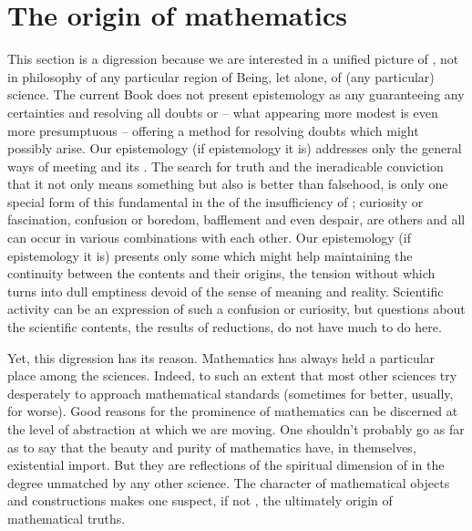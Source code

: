 \section{The origin of mathematics}\label{sec:om}
This section is a digression because we are interested in a unified picture of
, not in philosophy of any particular region of Being, let
alone, of (any particular) science.  The current Book does not present
epistemology as any  guaranteeing any certainties and
resolving all doubts or -- what appearing more modest is even more presumptuous
-- offering a method for resolving doubts which might possibly arise. Our
epistemology (if epistemology it is) addresses only the general ways of meeting
 and its . The search for truth and the
ineradicable conviction that it not only means something but also is better than
falsehood, is only one special form of this fundamental  
in the  of the insufficiency of ; curiosity
or fascination, confusion or boredom, bafflement and even despair, are
others and all can occur in various combinations with each other.  Our
epistemology (if epistemology it is) presents only some 
 which might help maintaining the continuity
between the  contents and their  origins, the
tension without which  turns into dull 
emptiness devoid of the sense of meaning and reality.  Scientific activity can
be an expression of such a confusion or curiosity, but questions about the 
scientific contents, the  results of 
reductions, do not have much to do here.

Yet, this digression has its reason.  Mathematics has always held a particular
place among the sciences.  Indeed, to such an extent that most other sciences
try desperately to approach mathematical standards (sometimes for better,
usually, for worse).  Good reasons for the prominence of mathematics can be
discerned at the level of abstraction at which we are moving.  One shouldn't
probably go as far as to say that the beauty and purity of mathematics have, in
themselves, existential import. But they are reflections of the spiritual dimension
of  in the degree unmatched by any other science. The 
character of mathematical objects and constructions makes one suspect, if not
, the ultimately
 origin of mathematical truths.

